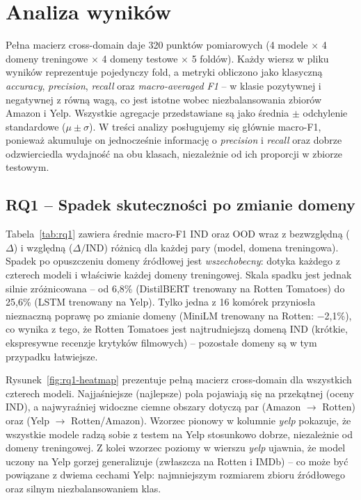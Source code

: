 \documentclass[runningheads]{llncs}
\begin{document}
\section*{Analiza wyników}
Pełna macierz cross-domain daje 320 punktów pomiarowych (4 modele $\times$ 4 domeny treningowe $\times$ 4 domeny testowe $\times$ 5 foldów). 
Każdy wiersz w pliku wyników reprezentuje pojedynczy fold, a metryki obliczono jako klasyczną \textit{accuracy}, \textit{precision}, \textit{recall} oraz \textit{macro-averaged F1} -- w klasie pozytywnej i negatywnej z równą wagą, co jest istotne wobec niezbalansowania zbiorów Amazon i Yelp. 
Wszystkie agregacje przedstawiane są jako średnia $\pm$ odchylenie standardowe ($\mu\pm\sigma$). 
W treści analizy posługujemy się głównie macro-F1, ponieważ akumuluje on jednocześnie informację o \textit{precision} i \textit{recall} oraz dobrze odzwierciedla wydajność na obu klasach, niezależnie od ich proporcji w zbiorze testowym.

\subsection*{RQ1 -- Spadek skuteczności po zmianie domeny}
Tabela~\ref{tab:rq1} zawiera średnie macro-F1 IND oraz OOD wraz z bezwzględną ($\Delta$) i względną ($\Delta/\mathrm{IND}$) różnicą dla każdej pary (model, domena treningowa). Spadek po opuszczeniu domeny źródłowej jest \emph{wszechobecny}: dotyka każdego z czterech modeli i właściwie każdej domeny treningowej. Skala spadku jest jednak silnie zróżnicowana -- od 6{,}8\% (DistilBERT trenowany na Rotten Tomatoes) do 25{,}6\% (LSTM trenowany na Yelp). Tylko jedna z 16 komórek przyniosła nieznaczną poprawę po zmianie domeny (MiniLM trenowany na Rotten: $-$2{,}1\%), co wynika z tego, że Rotten Tomatoes jest najtrudniejszą domeną IND (krótkie, ekspresywne recenzje krytyków filmowych) -- pozostałe domeny są w tym przypadku łatwiejsze.

\begin{table}[h]
\centering
\caption{Średnie macro-F1 w trybie IND i OOD wraz ze spadkiem $\Delta$ dla każdej pary (model, domena treningowa). Wartości IND uśrednione po 5 foldach, OOD dodatkowo po 3 docelowych domenach (15 pomiarów).}
\label{tab:rq1}

\end{table}

Rysunek~\ref{fig:rq1-heatmap} prezentuje pełną macierz cross-domain dla wszystkich czterech modeli. Najjaśniejsze (najlepsze) pola pojawiają się na przekątnej (oceny IND), a najwyraźniej widoczne ciemne obszary dotyczą par (Amazon $\rightarrow$ Rotten) oraz (Yelp $\rightarrow$ Rotten/Amazon). Wzorzec pionowy w kolumnie \textit{yelp} pokazuje, że wszystkie modele radzą sobie z testem na Yelp stosunkowo dobrze, niezależnie od domeny treningowej. Z kolei wzorzec poziomy w wierszu \textit{yelp} ujawnia, że model uczony na Yelp gorzej generalizuje (zwłaszcza na Rotten i IMDb) -- co może być powiązane z dwiema cechami Yelp: najmniejszym rozmiarem zbioru źródłowego oraz silnym niezbalansowaniem klas.
\end{document}
